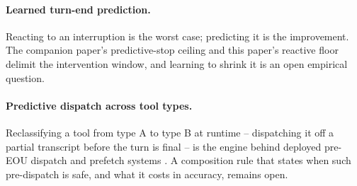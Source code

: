 \paragraph{Learned turn-end prediction.}
Reacting to an interruption is the worst case; predicting it is the improvement.
The companion paper's predictive-stop ceiling and this paper's reactive floor delimit the
intervention window, and learning to shrink it is an open empirical question.

\paragraph{Predictive dispatch across tool types.}
Reclassifying a tool from type A to type B at runtime -- dispatching it off a partial
transcript before the turn is final -- is the engine behind deployed pre-EOU dispatch and
prefetch systems \citep{specrag2024,agentsnotenough2024,lin2026fdbv3}.
A composition rule that states when such pre-dispatch is safe, and what it costs in accuracy,
remains open.
